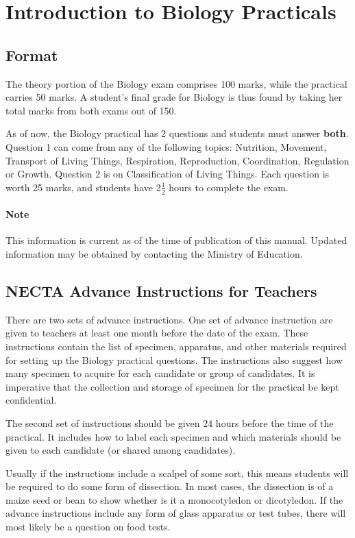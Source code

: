 \section{Introduction to Biology Practicals} 

\subsection{Format}
The theory portion of the Biology exam comprises 100 marks, while the practical carries 50 marks. A student's final grade for Biology is thus found by taking her total marks from both exams out of 150.

As of now, the Biology practical has 2 questions and students must answer \textbf{both}. Question 1 can come from any of the following topics: Nutrition, Movement, Transport of Living Things, Respiration, Reproduction, Coordination, Regulation or Growth. Question 2 is on Classification of Living Things. Each question is worth 25 marks, and students have 2$\frac{1}{2}$ hours to complete the exam.

\paragraph{Note} This information is current as of the time of publication of this manual. Updated information may be obtained by contacting the Ministry of Education. 

\subsection{NECTA Advance Instructions for Teachers}

There are two sets of advance instructions. One set of advance instruction are given to teachers at least one month before the date of the exam. These instructions contain the list of specimen, apparatus, and other materials required for setting up the Biology practical questions. The instructions also suggest how many specimen to acquire for each candidate or group of candidates. It is imperative that the collection and storage of specimen for the practical be kept confidential.

The second set of instructions should be given 24 hours before the time of the practical. It includes how to label each specimen and which materials should be given to each candidate (or shared among candidates).

Usually if the instructions include a scalpel of some sort, this means students will be required to do some form of dissection. In most cases, the dissection is of a maize seed or bean to show whether is it a monocotyledon or dicotyledon. If the advance instructions include any form of glass apparatus or test tubes, there will most likely be a question on food tests.

